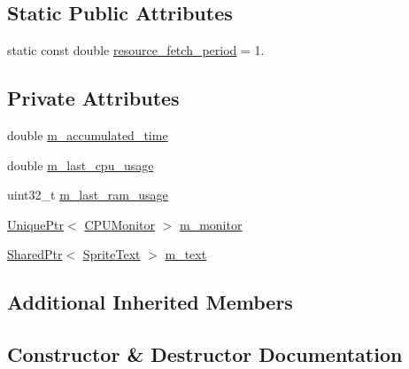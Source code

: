 \subsection*{Static Public Attributes}
\begin{DoxyCompactItemize}
\item 
static const double \hyperlink{classmage_1_1_system_usage_script_a98a30b1da6b9b87237e3509aed961162}{resource\+\_\+fetch\+\_\+period} = 1.
\end{DoxyCompactItemize}
\subsection*{Private Attributes}
\begin{DoxyCompactItemize}
\item 
double \hyperlink{classmage_1_1_system_usage_script_ab8df9ff99617df9010c4c2f27a6ff9c8}{m\+\_\+accumulated\+\_\+time}
\item 
double \hyperlink{classmage_1_1_system_usage_script_a4a49987cd15cdc2fa3d550a542191621}{m\+\_\+last\+\_\+cpu\+\_\+usage}
\item 
uint32\+\_\+t \hyperlink{classmage_1_1_system_usage_script_a64538d152d33546516a6acdda939b619}{m\+\_\+last\+\_\+ram\+\_\+usage}
\item 
\hyperlink{namespacemage_a8c307fbcc33bce9b7f2aa4c26c3b95cf}{Unique\+Ptr}$<$ \hyperlink{classmage_1_1_c_p_u_monitor}{C\+P\+U\+Monitor} $>$ \hyperlink{classmage_1_1_system_usage_script_a45574bef4a526bdd99108e92bf12dcbd}{m\+\_\+monitor}
\item 
\hyperlink{namespacemage_a1e01ae66713838a7a67d30e44c67703e}{Shared\+Ptr}$<$ \hyperlink{classmage_1_1_sprite_text}{Sprite\+Text} $>$ \hyperlink{classmage_1_1_system_usage_script_af6dd5e39889458ffb042f1d13fbcd7ea}{m\+\_\+text}
\end{DoxyCompactItemize}
\subsection*{Additional Inherited Members}


\subsection{Constructor \& Destructor Documentation}
\hypertarget{classmage_1_1_system_usage_script_a430d87647bdc6e407838863b1fcb750d}{}\label{classmage_1_1_system_usage_script_a430d87647bdc6e407838863b1fcb750d} 
